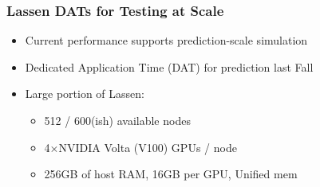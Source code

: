 \begin{frame}\frametitle{Lassen DATs for Testing at Scale}
  \begin{itemize}
  \item Current performance supports prediction-scale simulation
  \item Dedicated Application Time (DAT) for prediction last Fall 
  \item Large portion of Lassen:
    \begin{itemize}
    \item 512 / 600(ish) available nodes
    \item 4$\times$NVIDIA Volta (V100) GPUs / node
    \item 256GB of host RAM, 16GB per GPU, Unified mem
    \end{itemize}
  \end{itemize}
\end{frame}

